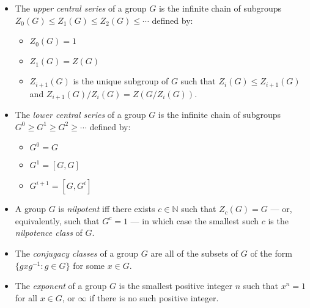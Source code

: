 \documentclass{article}
\newcommand{\N}{\mathbb{N}}
\begin{document}
\begin{itemize}
\item The \emph{upper central series} of a group $G$ is the infinite chain of subgroups $Z_0(G)\leq Z_1(G)\leq Z_2(G)\leq \cdots$ defined by:
 \begin{itemize}
 \item $Z_0(G) = 1$
 \item $Z_1(G) = Z(G)$
 \item $Z_{i+1}(G)$ is the unique subgroup of $G$ such that $Z_i(G)\leq Z_{i+1}(G)$ and $Z_{i+1}(G)/Z_i(G) = Z(G/Z_i(G))$.
 \end{itemize}
\item The \emph{lower central series} of a group $G$ is the infinite chain of subgroups $G^0\geq G^1\geq G^2\geq \cdots$ defined by:
 \begin{itemize}
 \item $G^0 = G$
 \item $G^1 = [G,G]$
 \item $G^{i+1} = [G, G^i]$
 \end{itemize}
\item A group $G$ is \emph{nilpotent} iff there exists $c\in\N$ such that $Z_c(G) = G$ --- or, equivalently, such that $G^c = 1$ --- in which case the smallest such $c$ is the \emph{nilpotence class} of $G$.

\item The \emph{conjugacy classes} of a group $G$ are all of the subsets of $G$ of the form $\{gxg^{-1} : g\in G\}$ for some $x\in G$.
\item The \emph{exponent} of a group $G$ is the smallest positive integer $n$ such that $x^n = 1$ for all $x\in G$, or $\infty$ if there is no such positive integer.

\end{itemize}
\end{document}
